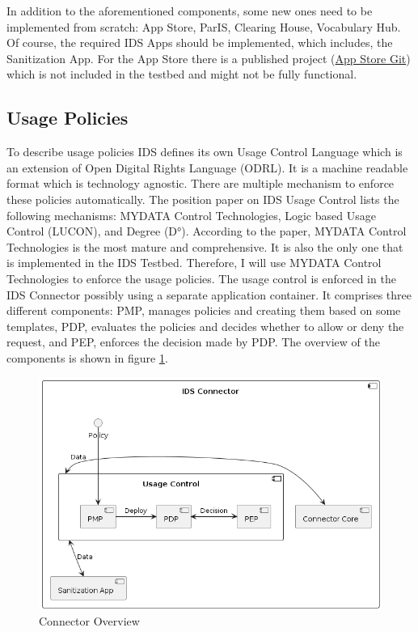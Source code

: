 \documentclass{article}
\begin{document}
In addition to the aforementioned components, some new ones need to be implemented from scratch: App Store, ParIS, Clearing House, Vocabulary Hub. Of course, the required IDS Apps should be implemented, which includes, the Sanitization App. 
For the App Store there is a published project (\href{https://github.com/International-Data-Spaces-Association/IDS-AppStore}{App Store Git}) which is not included in the testbed and might not be fully functional.

\subsection*{Usage Policies}
To describe usage policies IDS defines its own Usage Control Language which is an extension of Open Digital Rights Language (ODRL). It is a machine readable format which is technology agnostic. There are multiple mechanism to enforce these policies automatically. The position paper on IDS Usage Control \cite{eitel_usage_2021} lists the following mechanisms: MYDATA Control Technologies, Logic based Usage Control (LUCON), and Degree (D°). According to the paper, MYDATA Control Technologies is the most mature and comprehensive. It is also the only one that is implemented in the IDS Testbed. Therefore, I will use MYDATA Control Technologies to enforce the usage policies. The usage control is enforced in the IDS Connector possibly using a separate application container. It comprises three different components: PMP, manages policies and creating them based on some templates, PDP, evaluates the policies and decides whether to allow or deny the request, and PEP, enforces the decision made by PDP. The overview of the components is shown in figure \ref{fig:connector}.

\begin{figure}[ht]
    \centering
    \includegraphics[width=\textwidth]{connector}
    \caption{Connector Overview}
    \label{fig:connector}
\end{figure}
\end{document}
